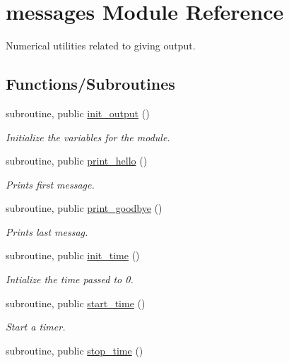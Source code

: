 \hypertarget{namespacemessages}{}\section{messages Module Reference}
\label{namespacemessages}


Numerical utilities related to giving output.  


\subsection*{Functions/\+Subroutines}
\begin{DoxyCompactItemize}
\item 
subroutine, public \hyperlink{namespacemessages_a5e45296f088e9f31115a3b8d869f3177}{init\+\_\+output} ()
\begin{DoxyCompactList}\small\item\em Initialize the variables for the module. \end{DoxyCompactList}\item 
subroutine, public \hyperlink{namespacemessages_a60c95b4c352b0087f32ef87279da49ca}{print\+\_\+hello} ()
\begin{DoxyCompactList}\small\item\em Prints first message. \end{DoxyCompactList}\item 
subroutine, public \hyperlink{namespacemessages_a5d3f456913230bdf985c363e8cee8489}{print\+\_\+goodbye} ()
\begin{DoxyCompactList}\small\item\em Prints last messag. \end{DoxyCompactList}\item 
subroutine, public \hyperlink{namespacemessages_a8ed785522aec7ac549263cdd54a8619a}{init\+\_\+time} ()
\begin{DoxyCompactList}\small\item\em Intialize the time passed to 0. \end{DoxyCompactList}\item 
subroutine, public \hyperlink{namespacemessages_a84d5988f3ea5ca8dc2834032f896ae90}{start\+\_\+time} ()
\begin{DoxyCompactList}\small\item\em Start a timer. \end{DoxyCompactList}\item 
subroutine, public \hyperlink{namespacemessages_aed343894ae4a28ad6dfbd1d39aac64ff}{stop\+\_\+time} ()

\end{DoxyCompactItemize}

